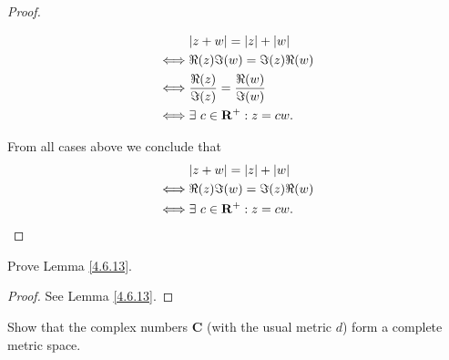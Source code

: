 \begin{proof}
\begin{itemize}
\begin{align*}
                       & \abs*{z + w} = \abs*{z} + \abs*{w}            \\
                  \iff & \Re(z) \Im(w) = \Im(z) \Re(w)                 \\
                  \iff & \frac{\Re(z)}{\Im(z)} = \frac{\Re(w)}{\Im(w)} \\
                  \iff & \exists\ c \in \mathbf{R}^+ : z = cw.
              \end{align*}
    \end{itemize}
    From all cases above we conclude that
    \begin{align*}
             & \abs*{z + w} = \abs*{z} + \abs*{w}    \\
        \iff & \Re(z) \Im(w) = \Im(z) \Re(w)         \\
        \iff & \exists\ c \in \mathbf{R}^+ : z = cw.
    \end{align*}
\end{proof}

\begin{exercise}\label{ex 4.6.9}
    Prove Lemma \ref{4.6.13}.
\end{exercise}

\begin{proof}
    See Lemma \ref{4.6.13}.
\end{proof}

\begin{exercise}\label{ex 4.6.10}
    Show that the complex numbers \(\mathbf{C}\) (with the usual metric \(d\)) form a complete metric space.
\end{exercise}

